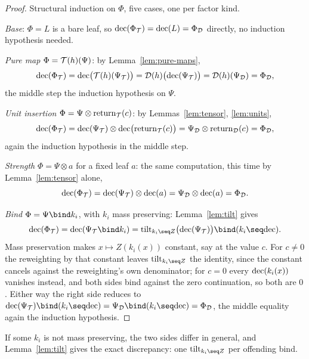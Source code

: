 \begin{proof}
\leanok
Structural induction on $\Phi$, five cases, one per factor kind.

\emph{Base}: $\Phi = L$ is a bare leaf, so $\mathrm{dec}(\Phi_{\mathcal T}) =
\mathrm{dec}(L) = \Phi_{\mathcal D}$ directly, no induction hypothesis needed.

\emph{Pure map} $\Phi = \mathcal T(h)(\Psi)$: by Lemma~\ref{lem:pure-maps},
\[
  \mathrm{dec}(\Phi_{\mathcal T}) = \mathrm{dec}\bigl(\mathcal T(h)(\Psi_{\mathcal T})\bigr)
    = \mathcal D(h)\bigl(\mathrm{dec}(\Psi_{\mathcal T})\bigr)
    = \mathcal D(h)(\Psi_{\mathcal D}) = \Phi_{\mathcal D},
\]
the middle step the induction hypothesis on $\Psi$.

\emph{Unit insertion} $\Phi = \Psi \otimes \mathrm{return}_{\mathcal T}(c)$: by
Lemmas~\ref{lem:tensor}, \ref{lem:units},
\[
  \mathrm{dec}(\Phi_{\mathcal T}) = \mathrm{dec}(\Psi_{\mathcal T}) \otimes \mathrm{dec}\bigl(\mathrm{return}_{\mathcal T}(c)\bigr)
    = \Psi_{\mathcal D} \otimes \mathrm{return}_{\mathcal D}(c) = \Phi_{\mathcal D},
\]
again the induction hypothesis in the middle step.

\emph{Strength} $\Phi = \Psi \otimes a$ for a fixed leaf $a$: the same
computation, this time by Lemma~\ref{lem:tensor} alone,
\[
  \mathrm{dec}(\Phi_{\mathcal T}) = \mathrm{dec}(\Psi_{\mathcal T}) \otimes \mathrm{dec}(a)
    = \Psi_{\mathcal D} \otimes \mathrm{dec}(a) = \Phi_{\mathcal D}.
\]

\emph{Bind} $\Phi = \Psi \bind k_i$, with $k_i$ mass preserving:
Lemma~\ref{lem:tilt} gives
\[
  \dec(\Phi_{\Tmon}) = \dec(\Psi_{\Tmon} \bind k_i)
    = \tilt_{k_i \seq Z}\bigl(\dec(\Psi_{\Tmon})\bigr) \bind (k_i \seq \dec).
\]
Mass preservation makes $x \mapsto Z(k_i(x))$ constant, say at the
value $c$. For $c \ne 0$ the reweighting by that constant leaves
$\tilt_{k_i \seq Z}$ the identity, since the constant cancels against
the reweighting's own denominator; for $c = 0$ every $\mathrm{dec}(k_i(x))$
vanishes instead, and both sides bind against the zero continuation, so
both are $0$.
Either way the right side reduces to $\dec(\Psi_{\Tmon}) \bind
(k_i \seq \dec) = \Psi_{\Dmon} \bind (k_i \seq \dec) = \Phi_{\Dmon}$,
the middle equality again the induction hypothesis.
\end{proof}

If some $k_i$ is not mass preserving, the two sides differ in general, and
Lemma~\ref{lem:tilt} gives the exact discrepancy: one
$\tilt_{k_i \seq Z}$ per offending bind.

